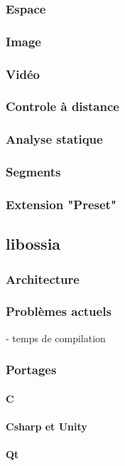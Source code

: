 \documentclass[french,a4paper]{book}
\begin{document}
\subsubsection{Espace}
\subsubsection{Image}
\subsubsection{Vidéo}
\subsubsection{Controle à distance}
\subsubsection{Analyse statique}
\subsubsection{Segments}
\subsubsection{Extension "Preset"}

\subsection{libossia}
\subsubsection{Architecture}
\subsubsection{Problèmes actuels}
- temps de compilation
\subsubsection{Portages}
\paragraph{C}
\paragraph{Csharp et Unity}
\paragraph{Qt}
\end{document}

